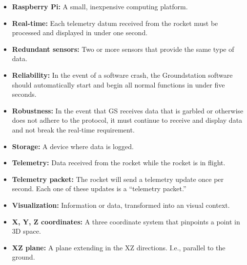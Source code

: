 \documentclass[10pt,draftclsnofoot,onecolumn]{IEEEtran}
\begin{document}
\begin{itemize}
		\item \textbf{Raspberry Pi:} A small, inexpensive computing platform.		
		\item \textbf{Real-time:} Each telemetry datum received from the rocket must be processed and
		displayed in under one second.
		\item \textbf{Redundant sensors:} Two or more sensors that provide the same type of data.
		\item \textbf{Reliability:} In the event of a software crash, the Groundstation software should automatically
		start and begin all normal functions in under five seconds.
		\item \textbf{Robustness:} In the event that GS receives data that is garbled or otherwise does not adhere
		to the protocol, it must continue to receive and display data and not break the real-time requirement.
		\item \textbf{Storage:} A device where data is logged.		
		\item \textbf{Telemetry:} Data received from the rocket while the rocket is in flight.
		\item \textbf{Telemetry packet:} The rocket will send a telemetry update once per second. Each one of these updates is a ``telemetry packet.''
		\item \textbf{Visualization:} Information or data, transformed into an visual context.
		\item \textbf{X, Y, Z coordinates:} A three coordinate system that pinpoints a point in 3D space.
		\item \textbf{XZ plane:} A plane extending in the XZ directions. I.e., parallel to the ground.
	\end{itemize}















\end{document}
